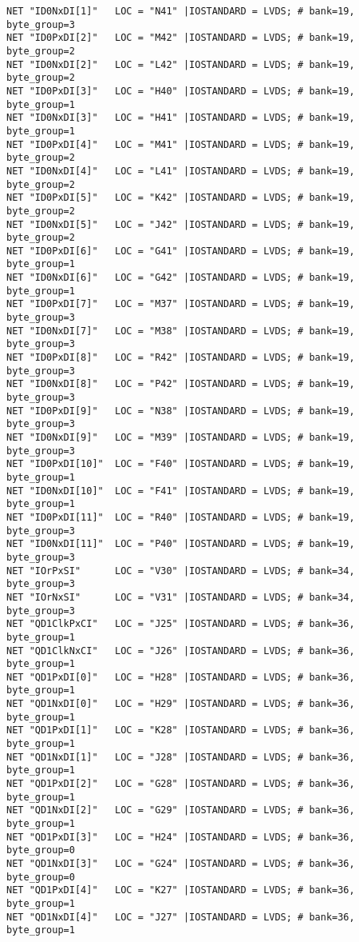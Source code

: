 \begin{appendix}
\begin{verbatim}
NET "ID0NxDI[1]"   LOC = "N41" |IOSTANDARD = LVDS; # bank=19, byte_group=3
NET "ID0PxDI[2]"   LOC = "M42" |IOSTANDARD = LVDS; # bank=19, byte_group=2
NET "ID0NxDI[2]"   LOC = "L42" |IOSTANDARD = LVDS; # bank=19, byte_group=2
NET "ID0PxDI[3]"   LOC = "H40" |IOSTANDARD = LVDS; # bank=19, byte_group=1
NET "ID0NxDI[3]"   LOC = "H41" |IOSTANDARD = LVDS; # bank=19, byte_group=1
NET "ID0PxDI[4]"   LOC = "M41" |IOSTANDARD = LVDS; # bank=19, byte_group=2
NET "ID0NxDI[4]"   LOC = "L41" |IOSTANDARD = LVDS; # bank=19, byte_group=2
NET "ID0PxDI[5]"   LOC = "K42" |IOSTANDARD = LVDS; # bank=19, byte_group=2
NET "ID0NxDI[5]"   LOC = "J42" |IOSTANDARD = LVDS; # bank=19, byte_group=2
NET "ID0PxDI[6]"   LOC = "G41" |IOSTANDARD = LVDS; # bank=19, byte_group=1
NET "ID0NxDI[6]"   LOC = "G42" |IOSTANDARD = LVDS; # bank=19, byte_group=1
NET "ID0PxDI[7]"   LOC = "M37" |IOSTANDARD = LVDS; # bank=19, byte_group=3
NET "ID0NxDI[7]"   LOC = "M38" |IOSTANDARD = LVDS; # bank=19, byte_group=3
NET "ID0PxDI[8]"   LOC = "R42" |IOSTANDARD = LVDS; # bank=19, byte_group=3
NET "ID0NxDI[8]"   LOC = "P42" |IOSTANDARD = LVDS; # bank=19, byte_group=3
NET "ID0PxDI[9]"   LOC = "N38" |IOSTANDARD = LVDS; # bank=19, byte_group=3
NET "ID0NxDI[9]"   LOC = "M39" |IOSTANDARD = LVDS; # bank=19, byte_group=3
NET "ID0PxDI[10]"  LOC = "F40" |IOSTANDARD = LVDS; # bank=19, byte_group=1
NET "ID0NxDI[10]"  LOC = "F41" |IOSTANDARD = LVDS; # bank=19, byte_group=1
NET "ID0PxDI[11]"  LOC = "R40" |IOSTANDARD = LVDS; # bank=19, byte_group=3
NET "ID0NxDI[11]"  LOC = "P40" |IOSTANDARD = LVDS; # bank=19, byte_group=3
NET "IOrPxSI"      LOC = "V30" |IOSTANDARD = LVDS; # bank=34, byte_group=3
NET "IOrNxSI"      LOC = "V31" |IOSTANDARD = LVDS; # bank=34, byte_group=3
NET "QD1ClkPxCI"   LOC = "J25" |IOSTANDARD = LVDS; # bank=36, byte_group=1
NET "QD1ClkNxCI"   LOC = "J26" |IOSTANDARD = LVDS; # bank=36, byte_group=1
NET "QD1PxDI[0]"   LOC = "H28" |IOSTANDARD = LVDS; # bank=36, byte_group=1
NET "QD1NxDI[0]"   LOC = "H29" |IOSTANDARD = LVDS; # bank=36, byte_group=1
NET "QD1PxDI[1]"   LOC = "K28" |IOSTANDARD = LVDS; # bank=36, byte_group=1
NET "QD1NxDI[1]"   LOC = "J28" |IOSTANDARD = LVDS; # bank=36, byte_group=1
NET "QD1PxDI[2]"   LOC = "G28" |IOSTANDARD = LVDS; # bank=36, byte_group=1
NET "QD1NxDI[2]"   LOC = "G29" |IOSTANDARD = LVDS; # bank=36, byte_group=1
NET "QD1PxDI[3]"   LOC = "H24" |IOSTANDARD = LVDS; # bank=36, byte_group=0
NET "QD1NxDI[3]"   LOC = "G24" |IOSTANDARD = LVDS; # bank=36, byte_group=0
NET "QD1PxDI[4]"   LOC = "K27" |IOSTANDARD = LVDS; # bank=36, byte_group=1
NET "QD1NxDI[4]"   LOC = "J27" |IOSTANDARD = LVDS; # bank=36, byte_group=1

\end{verbatim}
\end{appendix}
